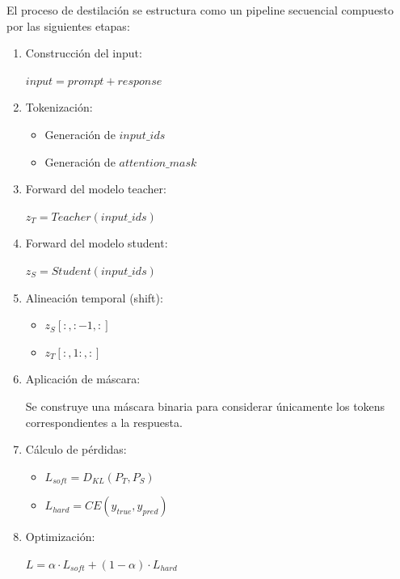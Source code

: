 \documentclass[12pt]{article}
\begin{document}
	El proceso de destilación se estructura como un pipeline secuencial compuesto por las siguientes etapas:
	
	\begin{enumerate}
		\item Construcción del input:
		\begin{center}
			$input = prompt + response$
		\end{center}
		
		\item Tokenización:
		\begin{itemize}
			\item Generación de $input\_ids$
			\item Generación de $attention\_mask$
		\end{itemize}
		
		\item Forward del modelo teacher:
		\begin{center}
			$z_T = Teacher(input\_ids)$
		\end{center}
		
		\item Forward del modelo student:
		\begin{center}
			$z_S = Student(input\_ids)$
		\end{center}
		
		\item Alineación temporal (shift):
		\begin{itemize}
			\item $z_S[:, :-1, :]$
			\item $z_T[:, 1:, :]$
		\end{itemize}
		
		\item Aplicación de máscara:
		
		Se construye una máscara binaria para considerar únicamente los tokens correspondientes a la respuesta.
		
		\item Cálculo de pérdidas:
		\begin{itemize}
			\item $L_{soft} = D_{KL}(P_T, P_S)$
			\item $L_{hard} = CE(y_{true}, y_{pred})$
		\end{itemize}
		
		\item Optimización:
		\begin{center}
			$L = \alpha \cdot L_{soft} + (1 - \alpha) \cdot L_{hard}$
		\end{center}
	\end{enumerate}
	
\end{document}
